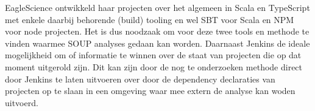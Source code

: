 EagleScience ontwikkeld haar projecten over het algemeen in Scala en TypeScript met enkele daarbij behorende (build) tooling en wel SBT voor Scala en NPM voor node projecten. Het is dus noodzaak om voor deze twee tools en methode te vinden waarmee SOUP analyses gedaan kan worden. Daarnaast Jenkins de ideale mogelijkheid om of informatie te winnen over de staat van projecten die op dat moment uitgerold zijn. Dit kan zijn door de nog te onderzoeken methode direct door Jenkins te laten uitvoeren over door de dependency declaraties van projecten op te slaan in een omgeving waar mee extern de analyse kan woden uitvoerd.
